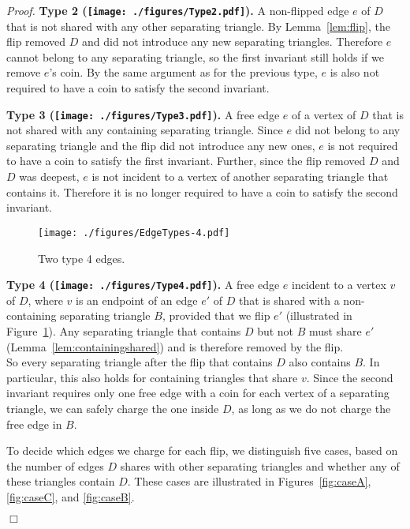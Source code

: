 \pdfoutput=1 \documentclass[12pt]{elsarticle}
\newenvironment{proof}{\emph{Proof.}}{\hfill $\Box$ \medskip\\}
\begin{document}
\begin{proof}
  \smallskip
  \textbf{Type 2 (\texttt{[image: ./figures/Type2.pdf]}).} A non-flipped edge $e$ of $D$ that is not shared with any other separating triangle. By Lemma~\ref{lem:flip}, the flip removed $D$ and did not introduce any new separating triangles. Therefore $e$ cannot belong to any separating triangle, so the first invariant still holds if we remove $e$'s coin. By the same argument as for the previous type, $e$ is also not required to have a coin to satisfy the second invariant.

  \smallskip



  \textbf{Type 3 (\texttt{[image: ./figures/Type3.pdf]}).} A free edge $e$ of a vertex of $D$ that is not shared with any containing separating triangle. Since $e$ did not belong to any separating triangle and the flip did not introduce any new ones, $e$ is not required to have a coin to satisfy the first invariant. Further, since the flip removed $D$ and $D$ was deepest, $e$ is not incident to a vertex of another separating triangle that contains it. Therefore it is no longer required to have a coin to satisfy the second invariant.

 \begin{figure}[ht]
  \centering
  \texttt{[image: ./figures/EdgeTypes-4.pdf]}
  \caption{Two type 4 edges.}
  \label{fig:superfluous}
 \end{figure}

  \smallskip
  \textbf{Type 4 (\texttt{[image: ./figures/Type4.pdf]}).} A free edge $e$ incident to a vertex $v$ of $D$, where $v$ is an endpoint of an edge $e'$ of $D$ that is shared with a non-containing separating triangle $B$, provided that we flip $e'$ (illustrated in Figure~\ref{fig:superfluous}). Any separating triangle that contains $D$ but not $B$ must share $e'$ (Lemma~\ref{lem:containingshared}) and is therefore removed by the flip.\\
So every separating triangle after the flip that contains $D$ also contains $B$. In particular, this also holds for containing triangles that share $v$. Since the second invariant requires only one free edge with a coin for each vertex of a separating triangle, we can safely charge the one inside $D$, as long as we do not charge the free edge in $B$.
 
 \medskip
 To decide which edges we charge for each flip, we distinguish five cases, based on the number of edges $D$ shares with other separating triangles and whether any of these triangles contain $D$. These cases are illustrated in Figures~\ref{fig:caseA}, \ref{fig:caseC}, and \ref{fig:caseB}.


\end{proof}
\end{document}
